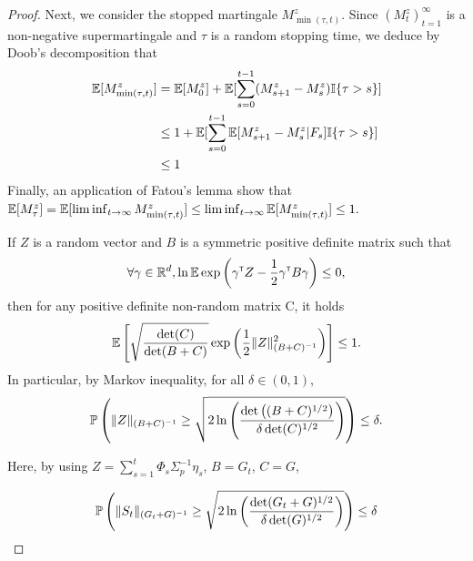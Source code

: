 \documentclass{article}
\begin{document}
\begin{proof}
Next, we consider the stopped martingale $M_{\min(\tau,t)}^z$. Since 
$(M_t^z)_{t=1}^\infty$ is a non-negative supermartingale and $\tau$ is a random stopping time, we deduce by Doob's decomposition that
\begin{align*}
\operatorname*{\mathbb{E}}[M_{\min(\tau,t)}^z] &= \operatorname*{\mathbb{E}}[M_0^z] + \operatorname*{\mathbb{E}}[\sum_{s=0}^{t-1} (M_{s+1}^z-M_s^z) \mathbb{I}\{\tau>s\}]\\
&\leq 1 + \operatorname*{\mathbb{E}}[\sum_{s=0}^{t-1} \operatorname*{\mathbb{E}}[M_{s+1}^z-M_s^z|F_{s}] \mathbb{I}\{\tau>s\}]\\
&\leq 1
\end{align*}
Finally, an application of Fatou's lemma show that 
$\operatorname*{\mathbb{E}}[M_\tau^z] = \operatorname*{\mathbb{E}}[\liminf_{t\to\infty} M_{\min(\tau,t)}^z] \leq \liminf_{t\to\infty} \operatorname*{\mathbb{E}}[M_{\min(\tau,t)}^z] \leq 1.$






\begin{lemma}
If $Z$ is a random vector and $B$ is a symmetric positive definite matrix such that
\[\forall \gamma\in\mathbb{R}^d, \ln \operatorname*{\mathbb{E}} \exp \left(\gamma^{\mathsf{\scriptscriptstyle T}} Z -\frac{1}{2} \gamma^{\mathsf{\scriptscriptstyle T}} B \gamma \right)\leq 0,\]
then for any positive definite non-random matrix C, it holds
\[\operatorname*{\mathbb{E}}\left[ \sqrt{\frac{\det(C)}{\det(B+C)} } \exp\left( \frac{1}{2}\|Z\|^2_{(B+C)^{-1}}\right)\right]\leq 1. \] 
In particular, by Markov inequality, for all $\delta\in(0,1)$, 
\[\mathbb{P}\left(\|Z\|_{(B+C)^{-1}} \geq \sqrt{2\ln \left(\frac{\det \left((B+C)^{1/2}\right)}{\delta\det(C)^{1/2}}\right)}\right)\leq \delta.\]
\end{lemma}

Here, by using $Z = \sum_{s=1}^t\Phi_s\Sigma_p^{-1}\eta_s$, $B=G_t$, $C=G$,

\[
\mathbb{P}\left(\| S_t \|_{(G_t+G)^{-1}} \geq \sqrt{2\ln \left(\frac{\det(G_t+G)^{1/2}}{\delta\det(G)^{1/2}}\right)}\right) \leq \delta
\]

\end{proof}
\end{document}
